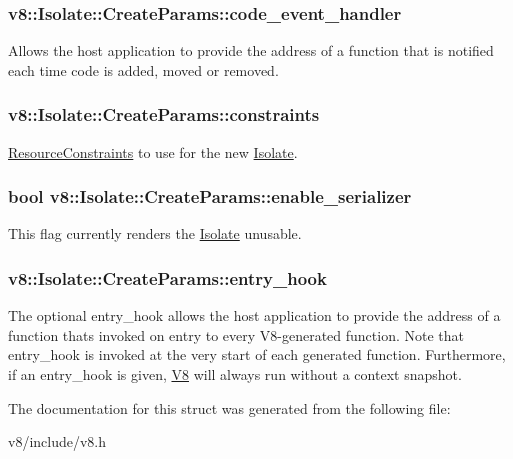 \subsubsection[{code\+\_\+event\+\_\+handler}]{ v8\+::\+Isolate\+::\+Create\+Params\+::code\+\_\+event\+\_\+handler}\label{structv8_1_1Isolate_1_1CreateParams_a783e3eba90ce6e2800bdd69197bbccdd}
Allows the host application to provide the address of a function that is notified each time code is added, moved or removed. \hypertarget{structv8_1_1Isolate_1_1CreateParams_a2c570b306aa8c1c24cfe70e8eee50fa1}{}
\subsubsection[{constraints}]{ v8\+::\+Isolate\+::\+Create\+Params\+::constraints}\label{structv8_1_1Isolate_1_1CreateParams_a2c570b306aa8c1c24cfe70e8eee50fa1}
\hyperlink{classv8_1_1ResourceConstraints}{Resource\+Constraints} to use for the new \hyperlink{classv8_1_1Isolate}{Isolate}. \hypertarget{structv8_1_1Isolate_1_1CreateParams_a6dae371b4c28bf7e8b3534dc24f13323}{}
\subsubsection[{enable\+\_\+serializer}]{\setlength{\rightskip}{0pt plus 5cm}bool v8\+::\+Isolate\+::\+Create\+Params\+::enable\+\_\+serializer}\label{structv8_1_1Isolate_1_1CreateParams_a6dae371b4c28bf7e8b3534dc24f13323}
This flag currently renders the \hyperlink{classv8_1_1Isolate}{Isolate} unusable. \hypertarget{structv8_1_1Isolate_1_1CreateParams_aa7aa18bbe2d86713e5b074a93b38dc60}{}
\subsubsection[{entry\+\_\+hook}]{ v8\+::\+Isolate\+::\+Create\+Params\+::entry\+\_\+hook}\label{structv8_1_1Isolate_1_1CreateParams_aa7aa18bbe2d86713e5b074a93b38dc60}
The optional entry\+\_\+hook allows the host application to provide the address of a function that\textquotesingle{}s invoked on entry to every V8-\/generated function. Note that entry\+\_\+hook is invoked at the very start of each generated function. Furthermore, if an entry\+\_\+hook is given, \hyperlink{classv8_1_1V8}{V8} will always run without a context snapshot. 

The documentation for this struct was generated from the following file\+:\begin{DoxyCompactItemize}
\item 
v8/include/v8.\+h\end{DoxyCompactItemize}
